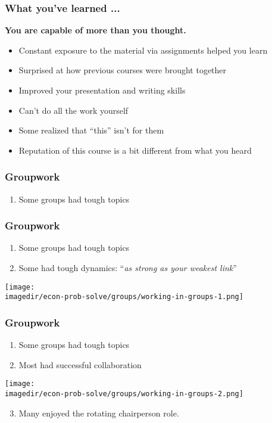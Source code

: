 \begin{frame}\frametitle{What you've learned ...}
	\begin{exampleblock}{}
		\begin{center}
			\textbf{\large You are capable of more than you thought.}
		\end{center}
	\end{exampleblock}
	\begin{itemize}
		\item	Constant exposure to the material via assignments helped you learn
		\item	Surprised at how previous courses were brought together
		\item	Improved your presentation and writing skills
		\item	Can't do all the work yourself
		\item	Some realized that ``this'' isn't for them
		\item	Reputation of this course is a bit different from what you heard
	\end{itemize}
\end{frame}

\begin{frame}\frametitle{Groupwork}
	\begin{enumerate}
		\item	Some groups had tough topics
	\end{enumerate}
	\vfill
\end{frame}

\begin{frame}\frametitle{Groupwork}
	\begin{enumerate}
		\item	Some groups had tough topics
		\item	Some had tough dynamics: ``\emph{as strong as your weakest link}''
	\end{enumerate}
	\begin{center}
		\texttt{[image: \\imagedir/econ-prob-solve/groups/working-in-groups-1.png]}
	\end{center}
\end{frame}

\begin{frame}\frametitle{Groupwork}
	\begin{enumerate}
		\item	Some groups had tough topics
		\item	Most had successful collaboration
	\end{enumerate}
	\begin{center}
		\texttt{[image: \\imagedir/econ-prob-solve/groups/working-in-groups-2.png]}
	\end{center}

	\begin{enumerate}
		\setcounter{enumi}{2}
		\item	Many enjoyed the rotating chairperson role.
	\end{enumerate}
\end{frame}

